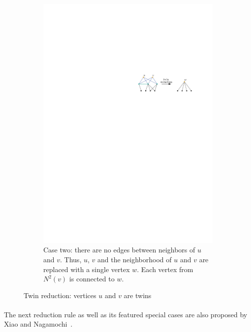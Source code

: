 \documentclass[12pt,a4paper,twoside]{scrartcl}
\numberwithin{equation}{section}
\begin{document}
\begin{figure}[htb]
\begin{subfigure}{\textwidth}
		\includegraphics[scale=1.5]{images/twin_red_1}
		\caption{Case two: there are no edges between neighbors of $u$ and $v$. Thus, $u$, $v$ and the neighborhood of $u$ and $v$ are replaced with a single vertex $w$. Each vertex from $N^2(v)$ is connected to $w$.}
	\end{subfigure}
\caption{Twin reduction: vertices $u$ and $v$ are twins}
\label{fig:twin_red}
\end{figure}

\paragraph{}
The next reduction rule as well as its featured special cases are also proposed by Xiao and Nagamochi~\cite{XiaoUnconfined}.
\end{document}
